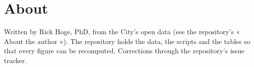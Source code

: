 \documentclass[11pt,letterpaper]{article}
\begin{document}
\section*{About}

Written by Rick Hoge, PhD, from the City's open data (see the repository's « About the author »). The repository holds the data, the scripts and the tables so that every figure can be recomputed. Corrections through the repository's issue tracker.
\end{document}
